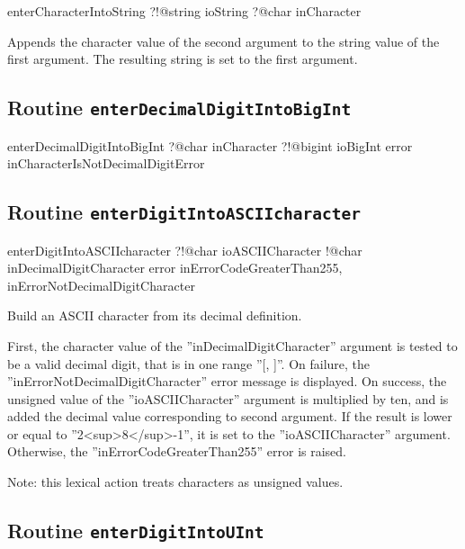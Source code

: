 \begin{galgas3}
enterCharacterIntoString ?!@string ioString
                         ?@char inCharacter
\end{galgas3}

Appends the character value of the second argument to the string value of the first argument. The resulting string is set to the first argument.

\subsection{Routine \texttt{enterDecimalDigitIntoBigInt}}

\begin{galgas3}
enterDecimalDigitIntoBigInt ?@char inCharacter
                            ?!@bigint ioBigInt
                            error inCharacterIsNotDecimalDigitError
\end{galgas3}

\subsection{Routine \texttt{enterDigitIntoASCIIcharacter}}

\begin{galgas3}
enterDigitIntoASCIIcharacter ?!@char ioASCIICharacter
                             !@char inDecimalDigitCharacter
                             error inErrorCodeGreaterThan255,
                                   inErrorNotDecimalDigitCharacter
\end{galgas3}

Build an ASCII character from its decimal definition.

First, the character value of the ''inDecimalDigitCharacter'' argument is tested to be a valid decimal digit, that is in one range ''[\textquotesingle, \textquotesingle]''. On failure, the ''inErrorNotDecimalDigitCharacter'' error message is displayed. On success, the unsigned value of the ''ioASCIICharacter'' argument is multiplied by ten, and is added the decimal value corresponding to second argument. If the result is lower or equal to ''2<sup>8</sup>-1'', it is set to the ''ioASCIICharacter'' argument. Otherwise, the ''inErrorCodeGreaterThan255'' error is raised.

Note: this lexical action treats characters as unsigned values.

\subsection{Routine \texttt{enterDigitIntoUInt}}

